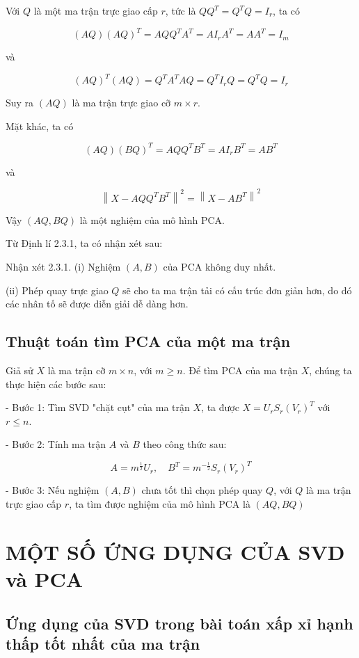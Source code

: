 \documentclass[12pt,a4paper,oneside]{report}
\numberwithin{equation}{section}
\begin{document}
Với $Q$ là một ma trận trực giao cấp $r$, tức là $Q Q^{T}=Q^{T} Q=I_{r}$, ta có

$$
(A Q)(A Q)^{T}=A Q Q^{T} A^{T}=A I_{r} A^{T}=A A^{T}=I_{m}
$$

và

$$
(A Q)^{T}(A Q)=Q^{T} A^{T} A Q=Q^{T} I_{r} Q=Q^{T} Q=I_{r}
$$

Suy ra $(A Q)$ là ma trận trực giao cỡ $m \times r$.

Mặt khác, ta có

$$
(A Q)(B Q)^{T}=A Q Q^{T} B^{T}=A I_{r} B^{T}=A B^{T}
$$

và

$$
\left\|X-A Q Q^{T} B^{T}\right\|^{2}=\left\|X-A B^{T}\right\|^{2}
$$

Vậy $(A Q, B Q)$ là một nghiệm của mô hình $\mathrm{PCA}$.

Từ Định lí 2.3.1, ta có nhận xét sau:

Nhận xét 2.3.1. (i) Nghiệm $(A, B)$ của PCA không duy nhất.

(ii) Phép quay trực giao $Q$ sẽ cho ta ma trận tải có cấu trúc đơn giản hơn, do đó các nhân tố sẽ được diễn giải dễ dàng hơn.

\section{Thuật toán tìm PCA của một ma trận}

Giả sử $X$ là ma trận cỡ $m \times n$, với $m \geq n$. Để tìm $\mathrm{PCA}$ của ma trận $X$, chúng ta thực hiện các bước sau:

- Bước 1: Tìm SVD "chặt cụt" của ma trận $X$, ta được $X=U_{r} S_{r}\left(V_{r}\right)^{T}$ với $r \leq n$.

- Bước 2: Tính ma trận $A$ và $B$ theo công thức sau:

$$
A=m^{\frac{1}{2}} U_{r}, \quad B^{T}=m^{-\frac{1}{2}} S_{r}\left(V_{r}\right)^{T}
$$

- Bước 3: Nếu nghiệm $(A, B)$ chưa tốt thì chọn phép quay $Q$, với $Q$ là ma trận trực giao cấp $r$, ta tìm được nghiệm của mô hình $\mathrm{PCA}$ là $(A Q, B Q)$


 
\chapter{ MỘT SỐ ỨNG DỤNG CỦA SVD và PCA }

\section{Ứng dụng của SVD trong bài toán xấp xỉ hạnh thấp tốt nhất của ma trận}
\end{document}
